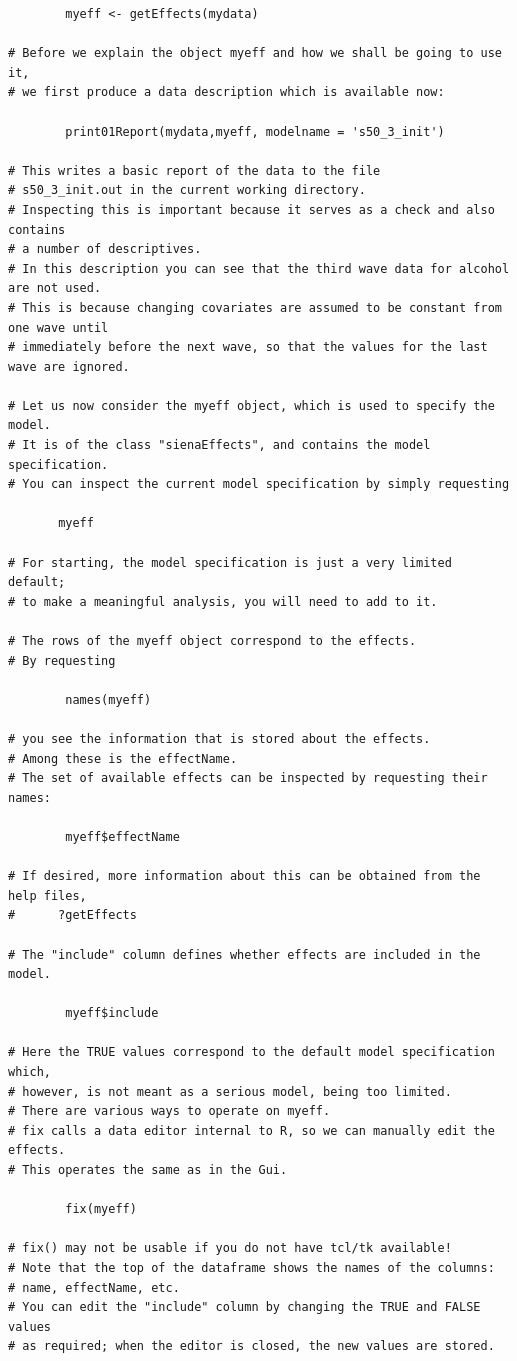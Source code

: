 \documentclass[a4paper,fleqn]{article}
\newcommand{\+}{\, + \,}
\begin{document}
{\begin{verbatim}
        myeff <- getEffects(mydata)

# Before we explain the object myeff and how we shall be going to use it,
# we first produce a data description which is available now:

        print01Report(mydata,myeff, modelname = 's50_3_init')

# This writes a basic report of the data to the file
# s50_3_init.out in the current working directory.
# Inspecting this is important because it serves as a check and also contains
# a number of descriptives.
# In this description you can see that the third wave data for alcohol are not used.
# This is because changing covariates are assumed to be constant from one wave until
# immediately before the next wave, so that the values for the last wave are ignored.

# Let us now consider the myeff object, which is used to specify the model.
# It is of the class "sienaEffects", and contains the model specification.
# You can inspect the current model specification by simply requesting

       myeff

# For starting, the model specification is just a very limited default;
# to make a meaningful analysis, you will need to add to it.

# The rows of the myeff object correspond to the effects.
# By requesting

        names(myeff)

# you see the information that is stored about the effects.
# Among these is the effectName.
# The set of available effects can be inspected by requesting their names:

        myeff$effectName

# If desired, more information about this can be obtained from the help files,
#      ?getEffects

# The "include" column defines whether effects are included in the model.

        myeff$include

# Here the TRUE values correspond to the default model specification which,
# however, is not meant as a serious model, being too limited.
# There are various ways to operate on myeff.
# fix calls a data editor internal to R, so we can manually edit the effects.
# This operates the same as in the Gui.

        fix(myeff)

# fix() may not be usable if you do not have tcl/tk available!
# Note that the top of the dataframe shows the names of the columns:
# name, effectName, etc.
# You can edit the "include" column by changing the TRUE and FALSE values
# as required; when the editor is closed, the new values are stored.


\end{verbatim}}
\end{document}

